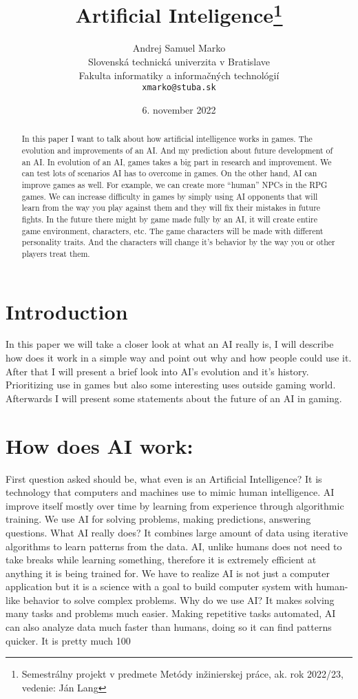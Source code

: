 \documentclass[12pt,twoside,english,a4paper]{article}
\title{Artificial Inteligence\thanks{Semestrálny projekt v predmete Metódy inžinierskej práce, ak. rok 2022/23, vedenie: Ján Lang}} %
\author{Andrej Samuel Marko\\[2pt]
	{\small Slovenská technická univerzita v Bratislave}\\
	{\small Fakulta informatiky a informačných technológií}\\
	{\small \texttt{xmarko@stuba.sk}}
	}
\date{\small 6. november 2022} %
\begin{document}
\maketitle

\begin{abstract}
In this paper I want to talk about how artificial intelligence works in games.
The evolution and improvements of an AI. And my prediction about future development of an AI. 
In evolution of an AI, games takes a big part in research and improvement.
We can test lots of scenarios AI has to overcome in games.
On the other hand, AI can improve games as well. For example, we can create more “human” NPCs in the RPG games.
We can increase difficulty in games by simply using AI opponents that will learn from the way you play against them and they will fix their mistakes in future fights.
In the future there might by game made fully by an AI, it will create entire game environment, characters, etc.
The game characters will be made with different personality traits. And the characters will change it’s behavior by the way you or other players treat them.
\end{abstract}

\section{Introduction}

In this paper we will take a closer look at what an AI really is, I will describe how does it work in a simple way and point out why and how people could use it.
After that I will present a brief look into AI’s evolution and it’s history.
Prioritizing use in games but also some interesting uses outside gaming world.
Afterwards I will present some statements about the future of an AI in gaming.



\section{How does AI work: } \label{1part}

First question asked should be, what even is an Artificial Intelligence?
It is technology that computers and machines use to mimic human intelligence.
AI improve itself mostly over time by learning from experience through algorithmic training.
We use AI for solving problems, making predictions, answering questions.
What AI really does? It combines large amount of data using iterative algorithms to learn patterns from the data.
AI, unlike humans does not need to take breaks while learning something, therefore it is extremely efficient at anything it is being trained for.
We have to realize AI is not just a computer application but it is a science with a goal to build computer system with human-like behavior to solve complex problems.  
Why do we use AI? It makes solving many tasks and problems much easier. Making repetitive tasks automated, 
AI can also analyze data much faster than humans, doing so it can find patterns quicker. It is pretty much 100%
 
\end{document}
